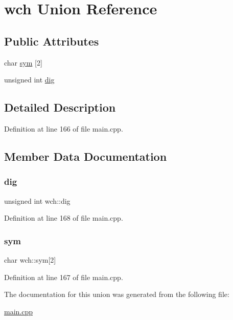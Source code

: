 \hypertarget{unionwch}{}\section{wch Union Reference}
\label{unionwch}
\subsection*{Public Attributes}
\begin{DoxyCompactItemize}
\item 
char \hyperlink{unionwch_af55b442864f410a46904f7fb15c1ca3a}{sym} \mbox{[}2\mbox{]}
\item 
unsigned int \hyperlink{unionwch_aa8de173ef97cc017c30e24819ab3a10a}{dig}
\end{DoxyCompactItemize}


\subsection{Detailed Description}


Definition at line 166 of file main.\+cpp.



\subsection{Member Data Documentation}
\mbox{\label{unionwch_aa8de173ef97cc017c30e24819ab3a10a}} 
\subsubsection{\texorpdfstring{dig}{dig}}
{\footnotesize\ttfamily unsigned int wch\+::dig}



Definition at line 168 of file main.\+cpp.

\mbox{\label{unionwch_af55b442864f410a46904f7fb15c1ca3a}} 
\subsubsection{\texorpdfstring{sym}{sym}}
{\footnotesize\ttfamily char wch\+::sym\mbox{[}2\mbox{]}}



Definition at line 167 of file main.\+cpp.



The documentation for this union was generated from the following file\+:\begin{DoxyCompactItemize}
\item 
\hyperlink{main_8cpp}{main.\+cpp}\end{DoxyCompactItemize}
